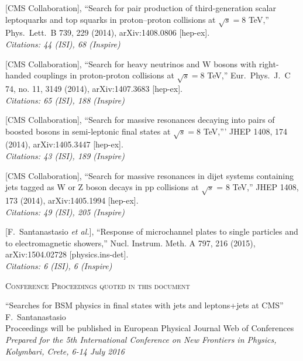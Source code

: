 \documentclass[10pt, a4paper]{article}
\begin{document}
\begin{thebibliography}{599}
  [CMS Collaboration],
  ``Search for pair production of third-generation scalar leptoquarks
  and top squarks in proton–proton collisions at $\sqrt{s}=8$ TeV,''
  Phys.\ Lett.\ B 739, 229 (2014), arXiv:1408.0806 [hep-ex].\\
\emph{Citations: 44 (ISI), 68 (Inspire)}

  [CMS Collaboration],
  ``Search for heavy neutrinos and $\mathrm {W}$ bosons with
  right-handed couplings in proton-proton collisions at $\sqrt{s}=8$ TeV,''
  Eur.\ Phys.\ J.\ C 74, no. 11, 3149 (2014), arXiv:1407.3683 [hep-ex].\\
\emph{Citations: 65 (ISI), 188 (Inspire)}

  [CMS Collaboration],
  ``Search for massive resonances decaying into pairs of boosted
  bosons in semi-leptonic final states at $\sqrt{s}=8$ TeV,'''
  JHEP 1408, 174 (2014), arXiv:1405.3447 [hep-ex].\\
\emph{Citations: 43 (ISI), 189 (Inspire)}

 [CMS Collaboration],
  ``Search for massive resonances in dijet systems containing jets
  tagged as W or Z boson decays in pp collisions at $ \sqrt{s} $ = 8 TeV,''
  JHEP 1408, 173 (2014), arXiv:1405.1994 [hep-ex].\\
\emph{Citations: 49 (ISI), 205 (Inspire)}

[F.~Santanastasio {\it et al.}],
  ``Response of microchannel plates to single particles and to electromagnetic showers,''
Nucl. Instrum. Meth. A 797, 216 (2015), arXiv:1504.02728 [physics.ins-det].\\
\emph{Citations: 6 (ISI), 6 (Inspire)}

\vspace{0.1cm} \begin{center} \textsc{Conference Proceedings quoted in
    this document} \end{center} \vspace{0.05cm}

  ``Searches for BSM physics in ﬁnal states with jets and leptons+jets at CMS''
  \\{}F.~Santanastasio
   \\{} Proceedings will be published in European Physical Journal Web of Conferences
  \\{}{\it Prepared for the 5th International Conference on New
    Frontiers in Physics, Kolymbari, Crete, 6-14 July 2016} 


\end{thebibliography}
\end{document}
